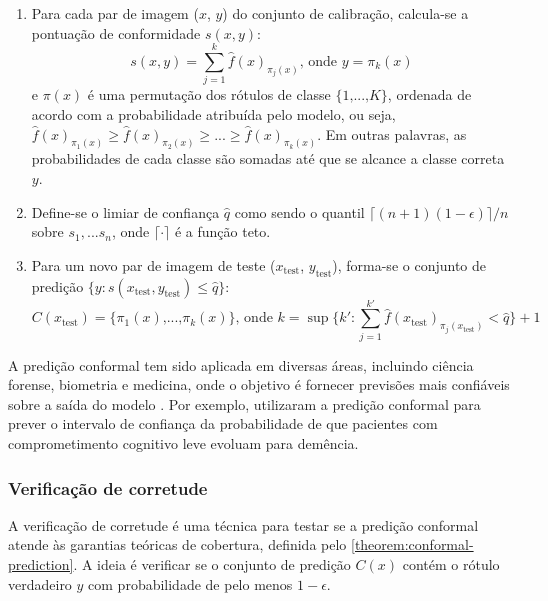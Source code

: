 \begin{enumerate}
    \item Para cada par de imagem ($x$, $y$) do conjunto de calibração, calcula-se a pontuação de conformidade $s(x,y)$:
    \begin{equation}
        s(x,y) = \sum_{j=1}^{k} \hat{f}(x)_{\pi_j(x)}\text{, onde } y = \pi_k(x)
    \end{equation}
    e $\pi(x)$ é uma permutação dos rótulos de classe $\lbrace 1 \text{,...,} K \rbrace$, ordenada de acordo com a probabilidade atribuída pelo modelo, ou seja, $\hat{f}(x)_{\pi_1(x)} \geq \hat{f}(x)_{\pi_2(x)} \geq ... \geq \hat{f}(x)_{\pi_k(x)}$. Em outras palavras, as probabilidades de cada classe são somadas até que se alcance a classe correta $y$.

    \item Define-se o limiar de confiança $\hat{q}$ como sendo o quantil ${\lceil (n+1)(1-\epsilon) \rceil}/n$ sobre $s_1, ... s_n$, onde $\lceil \cdot \rceil$ é a função teto.
    \item Para um novo par de imagem de teste ($x_{\text{test}}$, $y_{\text{test}}$), forma-se o conjunto de predição $\lbrace y:s(x_{\text{test}},y_{\text{test}}) \leq \hat{q} \rbrace$:
    \begin{equation}
        C(x_{\text{test}}) = \lbrace \pi_1(x) \text{,...,} \pi_k(x) \rbrace \text{, onde } k = \sup \Bigg\lbrace k' : \sum_{j=1}^{k'} \hat{f}(x_{\text{test}})_{\pi_j(x_{\text{test}})} < \hat{q} \Bigg\rbrace + 1
    \end{equation}
\end{enumerate}

A predição conformal tem sido aplicada em diversas áreas, incluindo ciência forense, biometria e medicina, onde o objetivo é fornecer previsões mais confiáveis sobre a saída do modelo \citep{Fontana2023}. Por exemplo, \cite{Pereira2020} utilizaram a predição conformal para prever o intervalo de confiança da probabilidade de que pacientes com comprometimento cognitivo leve evoluam para demência.

\subsubsection{Verificação de corretude}

A verificação de corretude é uma técnica para testar se a predição conformal atende às garantias teóricas de cobertura, definida pelo \autoref{theorem:conformal-prediction}. A ideia é verificar se o conjunto de predição $C(x)$ contém o rótulo verdadeiro $y$ com probabilidade de pelo menos $1 - \epsilon$.


